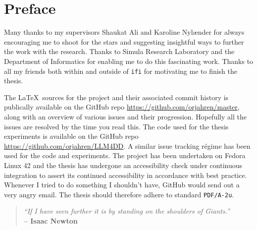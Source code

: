 \chapter*{Preface}

Many thanks to my supervisors Shaukat Ali and Karoline Nylænder for always encouraging me to
shoot for the stars and suggesting insightful ways to further the work with the research. Thanks to
Simula Research Laboratory and the Department of Informatics for enabling me to
do this fascinating work. Thanks to all my friends both within and outside of
\texttt{ifi} for motivating me to finish the thesis.

The \LaTeX~sources for the project and their associated commit history is publically available on
the GitHub repo \url{https://github.com/orjahren/master}, along with an overview of various issues
and their progression. Hopefully all the issues are resolved by the time you read this. The code
used for the thesis experiments is available on the GitHub repo
\url{https://github.com/orjahren/LLM4DD}. A similar issue tracking régime has been used for the
code and experiments. The project has been undertaken on Fedora Linux 42 and the thesis has
undergone an accessibility check under continuous integration to assert its continued accessibility
in accordance with best practice. Whenever I tried to do something I shouldn't have, GitHub would
send out a very angry email. The thesis should therefore adhere to standard \texttt{PDF/A-2u}.

\begin{center}
    \vspace{2em}
    \begin{quote}
        \emph{``If I have seen further it is by standing on the shoulders of Giants.''}\\
        \vspace{1em}
        \textbf{-- Isaac Newton}
    \end{quote}
    \vspace{2em}
\end{center}
